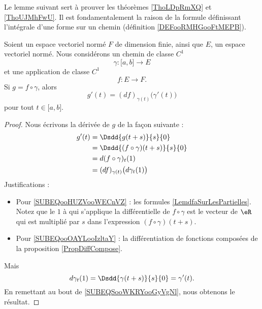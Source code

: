 Le lemme suivant sert à prouver les théorèmes \ref{ThoLDpRmXQ} et \ref{ThoUJMhFwU}. Il est fondamentalement la raison de la formule définissant l'intégrale d'une forme sur un chemin (définition \ref{DEFooRMHGooFtMEPB}).
\begin{lemma}        \label{LEMooKNBVooQSowos}
	Soient un espace vectoriel normé \( F\) de dimension finie, ainsi que \( E\), un espace vectoriel normé. Nous considérons un chemin de classe \( C^1\)
	\begin{equation}
		\gamma\colon \mathopen[ a , b \mathclose]\to E
	\end{equation}
	et une application de classe \( C^1\)
	\begin{equation}
		f\colon E\to F.
	\end{equation}
	Si \( g=f\circ\gamma\), alors
	\begin{equation}
		g'(t)=(df)_{\gamma(t)}\big( \gamma'(t) \big)
	\end{equation}
	pour tout \( t\in \mathopen[ a , b \mathclose]\).
\end{lemma}

\begin{proof}
	Nous écrivons la dérivée de \( g\) de la façon suivante :
	\begin{subequations}        \label{SUBEQSooWKRYooGyVgNl}
		\begin{align}
			g'(t) & =\Dsdd{ g(t+s) }{s}{0}                                                \\
			      & =\Dsdd{ (f\circ \gamma)(t+s) }{s}{0}                                  \\
			      & =d(f\circ \gamma)_t(1) \label{SUBEQooHUZVooWECnVZ}                    \\
			      & =(df)_{\gamma(t)}\big( d\gamma_t(1) \big) \label{SUBEQooOAYLooIzltaY} \\
		\end{align}
	\end{subequations}
	Justifications :
	\begin{itemize}
		\item Pour \eqref{SUBEQooHUZVooWECnVZ} : les formules \eqref{LemdfaSurLesPartielles}. Notez que le \( 1\) à qui s'applique la différentielle de \( f\circ\gamma\) est le vecteur de \( \eR\) qui est multiplié par \( s\) dans l'expression \( (f\circ\gamma)(t+s)\).
		\item
		      Pour \eqref{SUBEQooOAYLooIzltaY} : la différentiation de fonctions composées de la proposition \ref{PropDiffCompose}.
	\end{itemize}
	Mais
	\begin{equation}
		d\gamma_t(1)=\Dsdd{ \gamma(t+s) }{s}{0}=\gamma'(t).
	\end{equation}
	En remettant au bout de \eqref{SUBEQSooWKRYooGyVgNl}, nous obtenons le résultat.
\end{proof}


